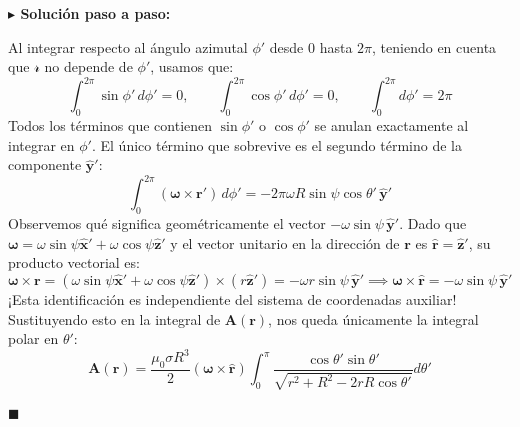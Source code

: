 \documentclass[11pt,a4paper]{book}
\newenvironment{solucion}{%
    \par\medskip\noindent\textbf{\color{blue!65!black}\Large $\blacktriangleright$ Solución paso a paso:}\par\medskip
}{%
    \hfill$\blacksquare$\par\bigskip
}
\newcommand{\rhat}{\hat{\bm{r}}}
\newcommand{\xhat}{\hat{\bm{x}}}
\newcommand{\yhat}{\hat{\bm{y}}}
\newcommand{\zhat}{\hat{\bm{z}}}
\newcommand{\Avec}{\bm{A}}
\begin{document}
\begin{solucion}
Al integrar respecto al ángulo azimutal $\phi'$ desde $0$ hasta $2\pi$, teniendo en cuenta que $\mathscr{r}$ no depende de $\phi'$, usamos que:
\begin{equation}
    \int_{0}^{2\pi} \sin\phi'\,d\phi' = 0, \qquad \int_{0}^{2\pi} \cos\phi'\,d\phi' = 0, \qquad \int_{0}^{2\pi} d\phi' = 2\pi
\end{equation}
Todos los términos que contienen $\sin\phi'$ o $\cos\phi'$ se anulan exactamente al integrar en $\phi'$. El único término que sobrevive es el segundo término de la componente $\yhat'$:
\begin{equation}
    \int_{0}^{2\pi} (\bm{\omega} \times \bm{r}')\,d\phi' = -2\pi\omega R \sin\psi \cos\theta'\,\yhat'
\end{equation}
Observemos qué significa geométricamente el vector $-\omega\sin\psi\,\yhat'$. Dado que $\bm{\omega} = \omega\sin\psi\xhat' + \omega\cos\psi\zhat'$ y el vector unitario en la dirección de $\bm{r}$ es $\rhat = \zhat'$, su producto vectorial es:
\begin{equation}
    \bm{\omega} \times \bm{r} = (\omega\sin\psi\xhat' + \omega\cos\psi\zhat') \times (r\zhat') = -\omega r \sin\psi\,\yhat' \implies \bm{\omega} \times \rhat = -\omega\sin\psi\,\yhat'
\end{equation}
¡Esta identificación es independiente del sistema de coordenadas auxiliar! Sustituyendo esto en la integral de $\Avec(\bm{r})$, nos queda únicamente la integral polar en $\theta'$:
\begin{equation}
    \Avec(\bm{r}) = \frac{\mu_0 \sigma R^3}{2} (\bm{\omega} \times \rhat) \int_{0}^{\pi} \frac{\cos\theta'\sin\theta'}{\sqrt{r^2 + R^2 - 2rR\cos\theta'}} d\theta'
\end{equation}


\end{solucion}
\end{document}
